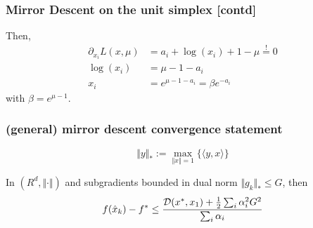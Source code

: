 \documentclass{beamer}
\begin{document}
\begin{frame}
  \frametitle{Mirror Descent on the unit simplex [contd]}
      Then,
      \begin{equation}
        \begin{aligned}
          \partial_{x_i} L(x,\mu) &= a_i + \log(x_i) +1 - \mu \overset{!}{=} 0 \\
          \log(x_i) &= \mu -1 - a_i  \\
          x_i &= e^{\mu - 1 - a_i} = \beta e^{-a_i}
        \end{aligned}
      \end{equation}
      with $\beta= e^{\mu-1}$.


\end{frame}

%
\begin{frame}
  \frametitle{(general) mirror descent convergence statement}
  \begin{equation}
    \Vert y \Vert_* := \max_{\Vert x \Vert=1} \{ \langle y, x \rangle\}
  \end{equation}
  \begin{theorem}
    In $(R^d, \Vert \cdot \Vert)$ and subgradients bounded in dual norm $\Vert g_k \Vert_* \le G$, then
    \begin{equation}
      f(\hat{x}_k) - f^* \le \frac{\mathcal{D}(x^*, x_1) + \frac12 \sum_i \alpha_i^2 G^2}{\sum_i \alpha_i}
    \end{equation}
  \end{theorem}


\end{frame}
\end{document}
